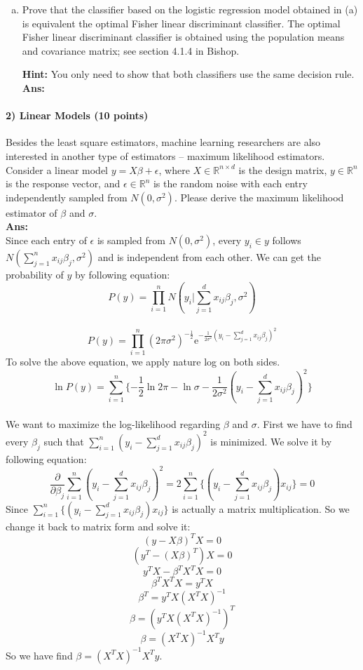 \documentclass[11pt]{article}
\begin{document}
\begin{enumerate}[(a)]
\item Prove that the classifier based on the logistic regression model obtained in (a) is equivalent the optimal Fisher linear discriminant classifier.  The optimal Fisher linear discriminant classifier is obtained using the population means and covariance matrix; see section 4.1.4 in Bishop.

{\bf Hint:} You only need to show that both classifiers use the same decision rule.\\
\textbf{Ans:}\\


\end{enumerate}

\paragraph{2) Linear Models (10 points)}
Besides the least square estimators, machine learning researchers are also interested in another type of estimators -- maximum likelihood estimators. Consider a linear model $y=X\beta+\epsilon$, where $X\in\mathbb{R}^{n \times d}$ is the design matrix, $y\in\mathbb{R}^{n}$ is the response vector, and $\epsilon\in\mathbb{R}^n$ is the random noise with each entry independently sampled from $N(0,\sigma^2)$. 
Please derive the maximum likelihood estimator of $\beta$ and $\sigma$.
\text{}\\
\textbf{Ans:}\\
Since each entry of $\epsilon$  is sampled from $N(0,\sigma^2)$, every $y_i \in y$ follows $N(\sum_{j=1}^{n} x_{ij}\beta_j,\sigma^2)$ and is independent from each other. We can get the probability of $y$ by following equation:\\
$$P(y) = \prod\limits_{i=1}^n N(y_i | \sum_{j=1}^{d} x_{ij}\beta_j,\sigma^2)$$\\
%
$$P(y) = \prod\limits_{i=1}^n (2 \pi\sigma^2)^{-\frac{1}{2}}\mathrm{e}^{-\frac{1}{2\sigma^2}(y_i-\sum_{j=1}^{d} x_{ij}\beta_j)^2}$$
%
To solve the above equation, we apply nature log on both sides.\\
$$\ln P(y) = \sum_{i=1}^{n} \{-\frac{1}{2}\ln 2\pi - \ln \sigma - \frac{1}{2\sigma^2}(y_i - \sum_{j=1}^{d} x_{ij}\beta_j)^2\}$$\\
We want to maximize the log-likelihood regarding $\beta$ and $\sigma$. First we have to find every $\beta_j$ such that $\sum_{i=1}^{n} (y_i - \sum_{j=1}^{d} x_{ij} \beta_j)^2$ is minimized. We solve it by following equation:\\
$$\frac{\partial}{\partial \beta_j} \sum_{i=1}^{n} (y_i - \sum_{j=1}^{d} x_{ij} \beta_j)^2 = 2\sum_{i=1}^{n} \{(y_i - \sum_{j=1}^{d} x_{ij}\beta_j)x_{ij}\}=0$$
%
Since $\sum_{i=1}^{n} \{(y_i - \sum_{j=1}^{d} x_{ij}\beta_j)x_{ij}\}$ is actually a matrix multiplication. So we change it back to matrix form and solve it:
$$(y-X\beta)^TX=0$$
$$(y^T - (X\beta)^T)X = 0$$
$$y^TX - \beta^TX^TX=0$$
$$\beta^TX^TX = y^TX$$
$$\beta^T = y^TX(X^TX)^{-1}$$
$$\beta = (y^TX(X^TX)^{-1})^T$$
$$\beta = (X^TX)^{-1}X^Ty$$
So we have find $\beta =(X^TX)^{-1}X^Ty$.\\
\end{document}

